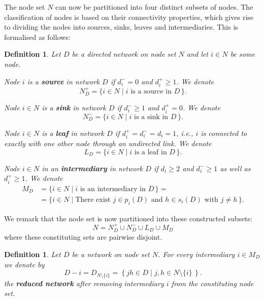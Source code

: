 \documentclass[11pt,fleqn]{article}
\newcounter{llst}
\newenvironment{numm}{\begin{list}{\rm (\roman{llst})}{\usecounter{llst}
\setlength{\itemindent}{0em} \setlength{\leftmargin}{3.5em}
\setlength{\labelwidth}{2.5em} \setlength{\labelsep}{1em}}}{\end{list}}
\newtheorem{definition}[theorem]{Definition}
\begin{document}
The node set $N$ can now be partitioned into four distinct subsets of nodes. The classification of nodes is based on their connectivity properties, which gives rise to dividing the nodes into sources, sinks, leaves and intermediaries. This is formalised as follows:
\begin{definition}
	Let $D$ be a directed network on node set $N$ and let $i \in N$ be some node.
	\begin{numm}
		\item Node $i$ is a \textbf{source} in network $D$ if $d_{i}^{-} = 0$ and $d_{i}^{+} \geqslant 1$. We denote
		\[
		N^+_D = \{ i \in N \mid i \mbox{ is a source in } D \, \} .
		\]
	\item Node $i \in N$ is a \textbf{sink} in network $D$ if $d_{i}^{-} \geqslant 1$ and $d_{i}^{+} = 0$. We denote
	\[
		N^-_D = \{ i \in N \mid i \mbox{ is a sink in } D \, \} .
	\]
	\item Node $i \in N$ is a \textbf{leaf} in network $D$ if $d_i^+ = d_i^- = d_i =1$, i.e., $i$ is connected to exactly with one other node through an undirected link. We denote
	\[
	L_D =  \{ i \in N \mid i \mbox{ is a leaf in } D \, \} .
	\]
	\item Node $i \in N$ in an \textbf{intermediary} in network $D$ if $d_i \geqslant 2$ and $d_{i}^{-} \geqslant 1$ as well as $d_{i}^{+} \geqslant 1$. We denote
	\begin{align*}
		M_D & = \{ i \in N \mid i \mbox{ is an intermediary in } D \, \} = \\
		& = \{ i \in N \mid \mbox{There exist } j \in p_i (D) \mbox{ and } h \in s_i (D) \mbox{ with } j \neq h \, \} .
	\end{align*}
	\end{numm}
\end{definition}

\noindent
We remark that the node set is now partitioned into these constructed subsets:
\begin{equation}
	N = N^+_D \cup N^-_D \cup L_D \cup M_D
\end{equation}
where these constituting sets are pairwise disjoint.

\begin{definition}
	Let $D$ be a network on node set $N$. For every intermediary $i \in M_D$ we denote by
	\begin{equation}
		D - i = D_{N \setminus \{ i \} } = \left\{ jh \in D \mid j,h \in N \setminus \{ i \} \, \right\} .
	\end{equation}
	the \textbf{reduced network} after removing intermediary $i$ from the constituting node set.
\end{definition}
\end{document}
